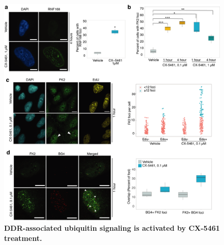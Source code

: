 \begin{figure}
    \centering
    \includegraphics[width=1\textwidth]{../figures/Figure3_Ub_signaling_foci}
    \caption[CX5461 induced ubiquitin signaling]
            {\small{\textbf{DDR-associated ubiquitin signaling is activated by CX-5461 treatment.}}
            }
        \label{fig:ubiquitin-signaling}
\end{figure}
\addtocounter{figure}{-1}
